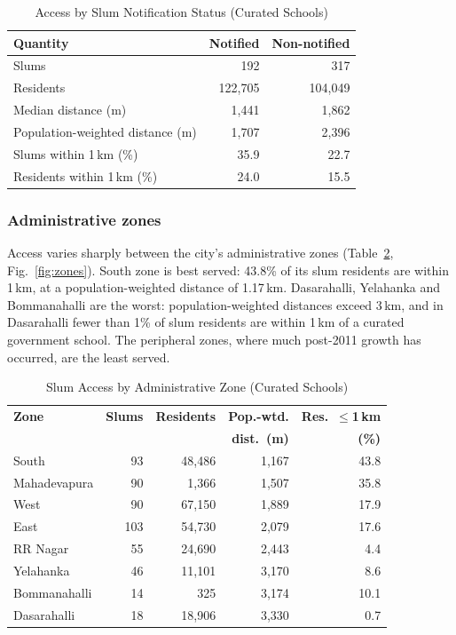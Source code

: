 \documentclass[conference]{IEEEtran}
\newcommand{\km}{\,km}
\begin{document}
\begin{table}[!t]
\centering
\caption{Access by Slum Notification Status (Curated Schools)}
\label{tab:notif}
\footnotesize
\begin{tabular}{@{}lrr@{}}
\toprule
\textbf{Quantity} & \textbf{Notified} & \textbf{Non-notified} \\
\midrule
Slums & 192 & 317 \\
Residents & 122,705 & 104,049 \\
Median distance (m) & 1,441 & 1,862 \\
Population-weighted distance (m) & 1,707 & 2,396 \\
Slums within 1\km{} (\%) & 35.9 & 22.7 \\
Residents within 1\km{} (\%) & 24.0 & 15.5 \\
\bottomrule
\end{tabular}
\end{table}

\subsubsection{Administrative zones}
Access varies sharply between the city's administrative zones (Table~\ref{tab:zones}, Fig.~\ref{fig:zones}). South zone is best served: 43.8\% of its slum residents are within 1\km{}, at a population-weighted distance of 1.17\km{}. Dasarahalli, Yelahanka and Bommanahalli are the worst: population-weighted distances exceed 3\km{}, and in Dasarahalli fewer than 1\% of slum residents are within 1\km{} of a curated government school. The peripheral zones, where much post-2011 growth has occurred, are the least served.

\begin{table}[!t]
\centering
\caption{Slum Access by Administrative Zone (Curated Schools)}
\label{tab:zones}
\footnotesize
\begin{tabular}{@{}lrrrr@{}}
\toprule
\textbf{Zone} & \textbf{Slums} & \textbf{Residents} & \textbf{Pop.-wtd.} & \textbf{Res.\ $\le$1\km{}} \\
 & & & \textbf{dist.\ (m)} & \textbf{(\%)} \\
\midrule
South & 93 & 48,486 & 1,167 & 43.8 \\
Mahadevapura & 90 & 1,366 & 1,507 & 35.8 \\
West & 90 & 67,150 & 1,889 & 17.9 \\
East & 103 & 54,730 & 2,079 & 17.6 \\
RR Nagar & 55 & 24,690 & 2,443 & 4.4 \\
Yelahanka & 46 & 11,101 & 3,170 & 8.6 \\
Bommanahalli & 14 & 325 & 3,174 & 10.1 \\
Dasarahalli & 18 & 18,906 & 3,330 & 0.7 \\
\bottomrule
\end{tabular}
\end{table}
\end{document}

